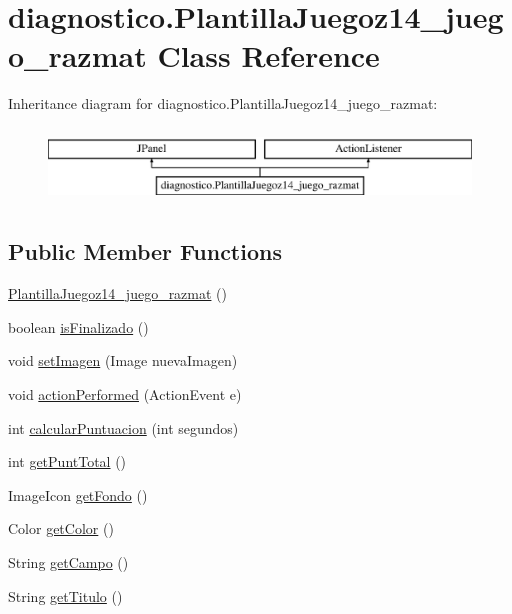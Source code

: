 \hypertarget{classdiagnostico_1_1_plantilla_juegoz14__juego__razmat}{}\section{diagnostico.\+Plantilla\+Juegoz14\+\_\+juego\+\_\+razmat Class Reference}
\label{classdiagnostico_1_1_plantilla_juegoz14__juego__razmat}
Inheritance diagram for diagnostico.\+Plantilla\+Juegoz14\+\_\+juego\+\_\+razmat\+:\begin{figure}[H]
\begin{center}
\leavevmode
\includegraphics[height=2.000000cm]{classdiagnostico_1_1_plantilla_juegoz14__juego__razmat}
\end{center}
\end{figure}
\subsection*{Public Member Functions}
\begin{DoxyCompactItemize}
\item 
\mbox{\hyperlink{classdiagnostico_1_1_plantilla_juegoz14__juego__razmat_a68b0c2ec4d0517b40418a594b2f88526}{Plantilla\+Juegoz14\+\_\+juego\+\_\+razmat}} ()
\item 
boolean \mbox{\hyperlink{classdiagnostico_1_1_plantilla_juegoz14__juego__razmat_a763aba3d83a57898e91f39d58ba24931}{is\+Finalizado}} ()
\item 
void \mbox{\hyperlink{classdiagnostico_1_1_plantilla_juegoz14__juego__razmat_a5f01b3186a4d496fb5623da0ac2108b6}{set\+Imagen}} (Image nueva\+Imagen)
\item 
void \mbox{\hyperlink{classdiagnostico_1_1_plantilla_juegoz14__juego__razmat_aa16a1978539ecb934b62a5f8a13a6c51}{action\+Performed}} (Action\+Event e)
\item 
int \mbox{\hyperlink{classdiagnostico_1_1_plantilla_juegoz14__juego__razmat_ae21cdf228470268b928401ca137a8588}{calcular\+Puntuacion}} (int segundos)
\item 
int \mbox{\hyperlink{classdiagnostico_1_1_plantilla_juegoz14__juego__razmat_a48e5aade20bad0177651734739aa1645}{get\+Punt\+Total}} ()
\item 
Image\+Icon \mbox{\hyperlink{classdiagnostico_1_1_plantilla_juegoz14__juego__razmat_a7056d6e9539b506e89dde284259d3d52}{get\+Fondo}} ()
\item 
Color \mbox{\hyperlink{classdiagnostico_1_1_plantilla_juegoz14__juego__razmat_adc84243a141af21c72e75c9b21491e10}{get\+Color}} ()
\item 
String \mbox{\hyperlink{classdiagnostico_1_1_plantilla_juegoz14__juego__razmat_aba44b0966c3b0a60fa97fc9cf31426b0}{get\+Campo}} ()
\item 
String \mbox{\hyperlink{classdiagnostico_1_1_plantilla_juegoz14__juego__razmat_a22c60d3681f81521042a1001a090174b}{get\+Titulo}} ()
\end{DoxyCompactItemize}
